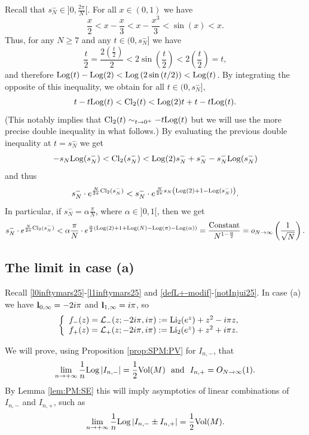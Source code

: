 \documentclass[11pt]{amsart}
\newcommand{\bl}{{\bf l}}
\newcommand{\Log}{{\rm Log}}
\newcommand{\ra}{\rightarrow}
\begin{document}
{Recall that $\textstyle s_N^-\in ]0,\frac{2\pi}{N}[$. For all $x\in (0,1)$ we have
$$ \frac{x}{2} < x-\frac{x}{3} < x - \frac{x^3}{3} < \sin(x) < x.$$
Thus, for any $N\geqslant 7$ and any $t\in (0,s_N^-]$ we have
$$ \frac{t}{2} = \frac{2(\frac{t}{2})}{2} < 2 \sin\left (\frac{t}{2}\right )< 2\left (\frac{t}{2}\right ) = t,$$
and therefore $\Log(t)-\Log(2) < \Log \left (2 \sin\left (t/2\right )\right ) < \Log(t)$. By integrating the opposite of this inequality, we obtain for all $t \in (0,s_N^-]$,
$$t -t\Log(t) <  {\rm Cl}_2(t) < \Log(2) t + t - t \Log(t).$$
(This notably implies that ${\rm Cl}_2(t) \sim_{t \to 0^+} -t\Log(t)$ but we will use the more precise double inequality in what follows.) By evaluating the previous double inequality at $t=s_N^-$ we get
$$-s_N\Log(s_N^-) <  {\rm Cl}_2(s_N^-) < \Log(2) s_N^- + s_N^- - s_N^- \Log(s_N^-)$$
and thus 
$$ s_N^- \cdot e^{\frac{N}{2\pi} {\rm Cl}_2(s_N^-)} <  s_N^-\cdot e^{\frac{N}{2\pi}s_N\left (\Log(2)+1-\Log(s_N^-)\right )}.$$
In particular, if $s_N^-=\alpha \frac{\pi}{N}$, where $\alpha \in ]0,1[$, then we get
$$ s_N^- \cdot e^{\frac{N}{2\pi} {\rm Cl}_2(s_N^-)} <  \alpha \frac{\pi}{N} \cdot e^{\frac{\alpha}{2}\left (\Log(2)+1+\Log(N) - \Log(\pi)-\Log(\alpha)\right )}= \dfrac{\text{Constant}}{N^{1-\frac{\alpha}{2}}}=o_{N\to \infty}\left (\frac{1}{\sqrt{N}}\right ).$$

\subsection{The limit in case (a)}\label{sub:SPM:a} Recall \eqref{l0inftymars25}-\eqref{l1inftymars25} and \eqref{defL+-modif}-\eqref{notInjui25}. In case (a) we have $\bl_{0,\infty}=-2i\pi$ and $\bl_{1,\infty}=i\pi$, so
\begin{equation}\label{defL+-modifcasea}
\left\lbrace
	\begin{array}{ll}
		f_-(z)= \mathcal{L}_-(z;-2i\pi,i\pi) := {\rm Li}_2(e^{z})+z^2 - i\pi z,& 
		\\
		f_+(z) = \mathcal{L}_+(z;-2i\pi,i\pi) := {\rm Li}_2(e^{z})+z^2 +i\pi  z.
		\end{array}\right.
\end{equation}

We will prove, using Proposition \ref{prop:SPM:PV} for $I_{n,-}$, that
\begin{equation}\label{asyIjui25}
\lim_{n\ra +\infty}  \dfrac{1}{n}\Log \left \vert I_{n,-} \right \vert = \dfrac{1}{2} {\rm Vol}(M)
  \ \ \text{and} \ \ 
I_{n,+} = O_{N\ra \infty}(1). 
\end{equation}
By Lemma \ref{lem:PM:SE} this will imply asymptotics of linear combinations of $I_{n,-}$ and $I_{n,+}$, such as
\begin{equation}\label{asyIjui25b}
\lim_{n\ra +\infty}  \dfrac{1}{n}\Log \left \vert I_{n,-} \pm I_{n,+} \right \vert = \dfrac{1}{2} {\rm Vol}(M).
\end{equation}

}
\end{document}
